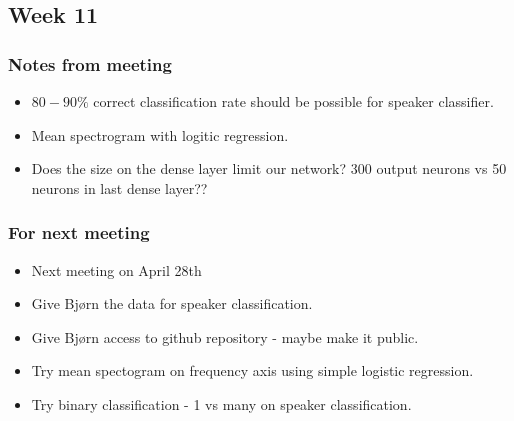 
\subsection{Week 11}

\subsubsection{Notes from meeting}

\begin{itemize}
\item $80-90 \%$ correct classification rate should be possible for speaker classifier.
\item Mean spectrogram with logitic regression.
\item Does the size on the dense layer limit our network? 300 output neurons vs 50 neurons in last dense layer??
\end{itemize}

\subsubsection{For next meeting}

\begin{itemize}
\item Next meeting on April 28th
\item Give Bjørn the data for speaker classification.
\item Give Bjørn access to github repository - maybe make it public.
\item Try mean spectogram on frequency axis using simple logistic regression.
\item Try binary classification - 1 vs many on speaker classification.
\end{itemize}
